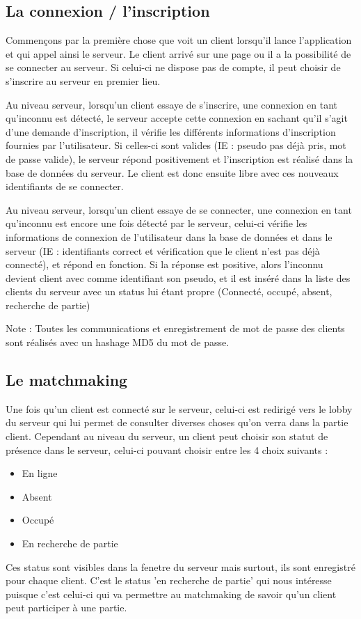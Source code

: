 \documentclass[12pt, openany]{report}
\begin{document}
	\subsection{La connexion / l'inscription}
	Commençons par la première chose que voit un client lorsqu'il lance l'application et qui appel ainsi le serveur. Le client arrivé sur une page ou il a la possibilité de se connecter au serveur. Si celui-ci ne dispose pas de compte, il peut choisir de s'inscrire au serveur en premier lieu.

	Au niveau serveur, lorsqu'un client essaye de s'inscrire, une connexion en tant qu'inconnu est détecté, le serveur accepte cette connexion en sachant qu'il s'agit d'une demande d'inscription, il vérifie les différents informations d'inscription fournies par l'utilisateur. Si celles-ci sont valides (IE : pseudo pas déjà pris, mot de passe valide), le serveur répond positivement et l'inscription est réalisé dans la base de données du serveur. Le client est donc ensuite libre avec ces nouveaux identifiants de se connecter.

	Au niveau serveur, lorsqu'un client essaye de se connecter, une connexion en tant qu'inconnu est encore une fois détecté par le serveur, celui-ci vérifie les informations de connexion de l'utilisateur dans la base de données et dans le serveur (IE : identifiants correct et vérification que le client n'est pas déjà connecté), et répond en fonction. Si la réponse est positive, alors l'inconnu devient client avec comme identifiant son pseudo, et il est inséré dans la liste des clients du serveur avec un status lui étant propre (Connecté, occupé, absent, recherche de partie)

	Note : Toutes les communications et enregistrement de mot de passe des clients sont réalisés avec un hashage MD5 du mot de passe.

	\subsection{Le matchmaking}

	Une fois qu'un client est connecté sur le serveur, celui-ci est redirigé vers le lobby du serveur qui lui permet de consulter diverses choses qu'on verra dans la partie client. Cependant au niveau du serveur, un client peut choisir son statut de présence dans le serveur, celui-ci pouvant choisir entre les 4 choix suivants : 
	\begin{itemize}
	    \item En ligne
	    \item Absent
	    \item Occupé
	    \item En recherche de partie    
	\end{itemize}
Ces status sont visibles dans la fenetre du serveur mais surtout, ils sont enregistré pour chaque client. C'est le status 'en recherche de partie' qui nous intéresse puisque c'est celui-ci qui va permettre au matchmaking de savoir qu'un client peut participer à une partie. 
\end{document}
